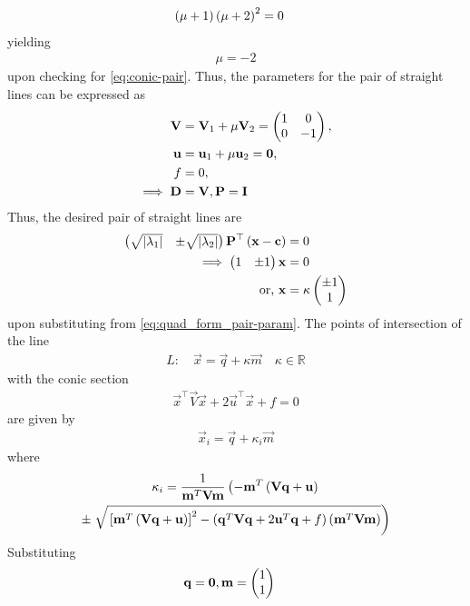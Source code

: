\documentclass[journal,12pt,twocolumn]{IEEEtran}
\renewcommand\thesection{\arabic{section}}
\begin{document}
\begin{enumerate}[label=\thesection.\arabic*.,ref=\thesection.\theenumi]
\begin{align}
	\left(\mu + 1\right)\left(\mu + 2\right)^2 &= 0
    \end{align}
    yielding
\begin{align}
\mu =  -2
    \end{align}
upon checking for \eqref{eq:conic-pair}.  Thus, the parameters for the pair of straight lines can be expressed as
\begin{align}
	\mathbf{V} &= 
\mathbf{V}_1 + \mu\mathbf{V}_2
=\begin{pmatrix} 1 & 0 \\ 0 & -1\end{pmatrix},
\\
	\mathbf{u} &=
\mathbf{u}_1+\mu \mathbf{u}_2
	= \mathbf{0},
\\
	f&=0,
	\\
	\implies \mathbf{D} &= \mathbf{V}, \mathbf{P} = \mathbf{I}
\label{eq:quad_form_pair-param}
    \end{align}
    Thus, the desired pair of straight lines are 
\begin{align} 
	\begin{pmatrix}\sqrt{\left\vert\lambda_1\right\vert} & \pm \sqrt{\left\vert\lambda_2\right\vert}\end{pmatrix}\mathbf{P}^{\top}\left(\mathbf{x}-\mathbf{c}\right) &= 0
	\\
	\implies 
	\begin{pmatrix}1 & \pm 1\end{pmatrix}\mathbf{x} &= 0
	\\
	\text{or, }\mathbf{x} &= \kappa \begin{pmatrix}\pm 1 \\ 1\end{pmatrix}
\end{align} 
upon substituting from 
\eqref{eq:quad_form_pair-param}.
The points of intersection of the line 
\begin{align}
L: \quad \vec{x} = \vec{q} + \kappa \vec{m} \quad \kappa \in \mathbb{R}
\label{eq:conic_tangent}
\end{align}
with the conic section 
\begin{align}
	\vec{x}^{\top}\vec{V}\vec{x} + 2\vec{u}^{\top} \vec{x} + f = 0
\label{eq:conic_quad_form}
\end{align}
are given by
\begin{align}
\vec{x}_i = \vec{q} + \kappa_i \vec{m}
\label{eq:conic_tangent_pts}
\end{align}
%
where
{\tiny
\begin{multline}
\kappa_i = \frac{1}
{
\mathbf{m}^T\mathbf{V}\mathbf{m}
}
\left(-\mathbf{m}^T\left(\mathbf{V}\mathbf{q}+\mathbf{u}\right)\right.
\\
\pm
\left.\sqrt{
{}\left[
\mathbf{m}^T\left(\mathbf{V}\mathbf{q}+\mathbf{u}\right)
\right]^2
-
\left(
\mathbf{q}^T\mathbf{V}\mathbf{q} + 2\mathbf{u}^T\mathbf{q} +f
\right)
\left(\mathbf{m}^T\mathbf{V}\mathbf{m}\right)
}
\right)
\label{eq:tangent_roots}
\end{multline}
}
Substituting
\begin{align}
	\vec{q} &= \vec{0}, \vec{m} = \myvec{1 \\ 1}

\end{align}
\end{enumerate}
\end{document}
